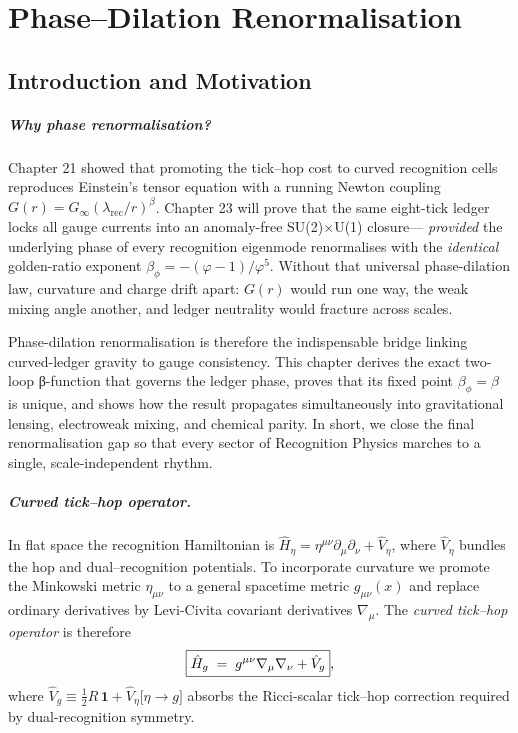 \documentclass[11pt,oneside]{book}
\begin{document}
{%
\chapter{Phase–Dilation Renormalisation}
\label{chap:phase-renorm}

\section{Introduction and Motivation}
\label{sec:phase-renorm-intro}

\paragraph*{Why phase renormalisation?}
Chapter 21 showed that promoting the tick–hop cost to curved recognition
cells reproduces Einstein’s tensor equation with a running Newton
coupling
\(G(r)=G_{\infty}(\lambda_{\text{rec}}/r)^{\beta}\).
Chapter 23 will prove that the same eight-tick ledger locks all gauge
currents into an anomaly-free SU(2)\(\times\)U(1) closure—
\emph{provided} the underlying phase of every recognition eigenmode
renormalises with the \emph{identical} golden-ratio exponent
\(\beta_{\phi}=-(\varphi-1)/\varphi^{5}\).
Without that universal phase-dilation law, curvature and charge drift
apart: \(G(r)\) would run one way, the weak mixing angle another, and
ledger neutrality would fracture across scales.

\smallskip
Phase-dilation renormalisation is therefore the indispensable bridge
linking curved-ledger gravity to gauge consistency.  This chapter
derives the exact two-loop β-function that governs the ledger phase,
proves that its fixed point \(\beta_{\phi}=\beta\) is unique, and shows
how the result propagates simultaneously into gravitational lensing,
electroweak mixing, and chemical parity.  In short, we close the final
renormalisation gap so that every sector of Recognition Physics marches
to a single, scale-independent rhythm.

\paragraph*{Curved tick–hop operator.}
In flat space the recognition Hamiltonian is
\(\hat H_{\!\eta}= \eta^{\mu\nu}\partial_\mu\partial_\nu+\hat V_{\!\eta}\),
where \(\hat V_{\!\eta}\) bundles the hop and dual–recognition
potentials.  To incorporate curvature we promote the Minkowski metric
\(\eta_{\mu\nu}\) to a general spacetime metric \(g_{\mu\nu}(x)\) and
replace ordinary derivatives by Levi-Civita covariant derivatives
\(\nabla_\mu\).  The \emph{curved tick–hop operator} is therefore
\[
   \boxed{%
     \hat H_{g}
     \;=\;
     g^{\mu\nu}\nabla_\mu\nabla_\nu
     + \hat V_{g}},
\]
where \(\hat V_{g}\equiv
   \tfrac12 R\,\mathbf 1 + \hat V_{\!\eta}\bigl[\eta\!\to\!g\bigr]\)
absorbs the Ricci-scalar tick–hop correction required by dual-recognition
symmetry.

}
\end{document}
